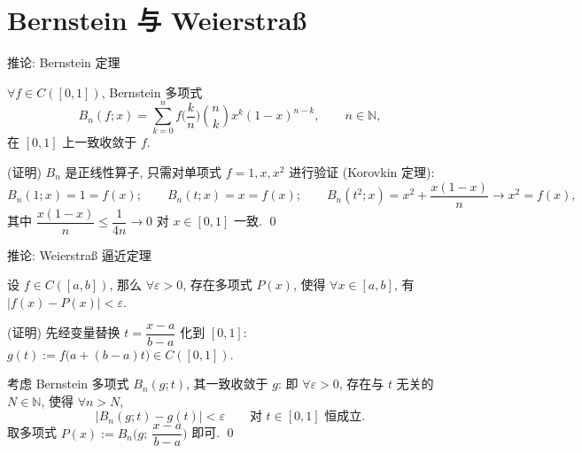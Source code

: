 
\section[逼近定理]{Bernstein 与 Weierstra\ss{}}


\begin{frame}{推论: Bernstein 定理}

\begin{cor}[Bernstein 定理]
$\forall f \in C([0,1])$, Bernstein 多项式
\[
B_n(f; x) = \sum_{k=0}^{n} f \Big( \frac{k}{n} \Big) \binom{n}{k}
x^k (1 - x)^{n-k}, \qquad n \in \mathbb{N},
\]
在 $[0,1]$ 上一致收敛于 $f$.
\end{cor}

\pause

\startproof[bg=yellow, fg=red](证明)
$B_n$ 是正线性算子, 只需对单项式 $f = 1, x, x^2$ 进行验证 (Korovkin 定理):
\[
B_n(1; x) = 1 = f(x);
\qquad
B_n(t; x) = x = f(x);
\qquad
B_n(t^2; x) = x^2 + \frac{x (1 - x)}{n} \longrightarrow x^2 = f(x),
\]
其中 $\dfrac{x(1-x)}{n} \leqslant \dfrac{1}{4n} \to 0$ 对 $x \in [0,1]$ 一致.
\qed

\end{frame}


\begin{frame}{推论: Weierstra\ss{} 逼近定理}

\begin{cor}
设 $f \in C([a,b])$, 那么 $\forall \varepsilon > 0$, 存在多项式 $P(x)$,
使得 $\forall x \in [a,b]$, 有 $|f(x) - P(x)| < \varepsilon$.
\end{cor}

\startproof[bg=yellow, fg=red](证明)
先经变量替换 $t = \dfrac{x - a}{b - a}$ 化到 $[0,1]$:
$g(t) := f\big( a + (b - a) t \big) \in C([0,1])$.

考虑 Bernstein 多项式 $B_n(g; t)$, 其一致收敛于 $g$:
即 $\forall \varepsilon > 0$, 存在与 $t$ 无关的 $N \in \mathbb{N}$,
使得 $\forall n > N$,
\[
\big| B_n(g; t) - g(t) \big| < \varepsilon
\qquad \text{对 } t \in [0,1] \text{ 恒成立}.
\]
取多项式 $P(x) := B_n \Big( g;\ \dfrac{x - a}{b - a} \Big)$ 即可.
\qed

\end{frame}



